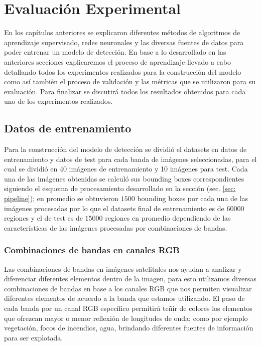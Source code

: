 \chapter{Evaluación Experimental}\label{chap:evaluacion}

En los capítulos anteriores se explicaron diferentes métodos de algoritmos de aprendizaje supervisado, redes neuronales y las diversas fuentes de datos para poder entrenar un modelo de detección. En  base a lo desarrollado en las anteriores secciones  explicaremos el proceso de aprendizaje llevado a cabo detallando todos los  experimentos realizados para la construcción del modelo como así también  el proceso de validación y las métricas que se utilizaron para su evaluación. Para finalizar se discutirá todos los resultados obtenidos para cada uno de los  experimentos realizados. 

\section{Datos de entrenamiento}\label{sec:datos_entrenamiento}

Para la construcción del modelo de detección se dividió el datasets en datos de entrenamiento y datos de test para cada banda de imágenes seleccionadas,  para el cual se dividió en 40 imágenes de entrenamiento y 10 imágenes para test. Cada una de las imágenes obtenidas se calculó sus bounding boxes correspondientes  siguiendo el esquema de procesamiento desarrollado  en la sección (sec. \ref{sec: pipeline}); en promedio se obtuvieron $1500$ bounding boxes por cada una de las imágenes procesadas por lo que el datasets final de entrenamiento es de $60000$ regiones y el de test es de $15000$ regiones en promedio dependiendo de las características de las imágenes procesadas por combinaciones de bandas. 

\subsection{Combinaciones de bandas en canales RGB}\label{sub:comb_de_banda} 

Las combinaciones de bandas en imágenes satelitales nos ayudan a analizar y diferenciar diferentes elementos dentro de la imagen, para esto utilizamos diversas combinaciones de bandas en base a los canales RGB que nos permiten visualizar diferentes elementos de acuerdo a la banda que estamos utilizando. El paso de cada banda por un canal RGB específico permitirá teñir de colores los elementos que ofrezcan mayor o menor reflexión de longitudes de onda; como por ejemplo vegetación, focos de incendios, agua, brindando diferentes fuentes de información para ser explotada.

